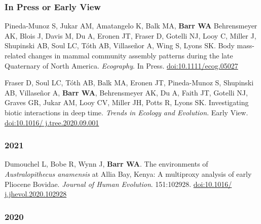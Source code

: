 



\subsubsection*{In Press or Early View}

\item Pineda-Munoz S, Jukar AM, Amatangelo K, Balk MA, {\bfseries Barr WA} Behrensmeyer AK, Blois J, Davis M, Du A, Eronen JT, Fraser D, Gotelli NJ, Looy C, Miller J, Shupinski AB, Soul LC, Tóth AB, Villaseñor A, Wing S, Lyons SK. Body mass-related changes in mammal community assembly patterns during the late Quaternary of North America. \emph{Ecography}. In Press. \href{https://dx.doi.org/10.1111/ecog.05027}{doi:10.1111/ecog.05027}

\item Fraser D, Soul LC, Tóth AB, Balk MA, Eronen JT, Pineda-Munoz S, Shupinski AB, Villaseñor A, {\bfseries Barr WA}, Behrensmeyer AK, Du A, Faith JT, Gotelli NJ, Graves GR, Jukar AM, Looy CV, Miller JH, Potts R, Lyons SK. Investigating biotic interactions in deep time. \emph{Trends in Ecology and Evolution}. Early View. \href{https://doi.org/10.1016/j.tree.2020.09.001}{doi:10.1016/ j.tree.2020.09.001} 

\subsubsection*{2021}

\item Dumouchel L, Bobe R, Wynn J, {\bfseries Barr WA}. The environments of \emph{Australopithecus anamensis} at Allia Bay, Kenya: A multiproxy analysis of early Pliocene Bovidae. \emph{Journal of Human Evolution}. 151:102928. \href{https://doi.org/10.1016/j.jhevol.2020.102928}{doi:10.1016/ j.jhevol.2020.102928}


\subsubsection*{2020}



